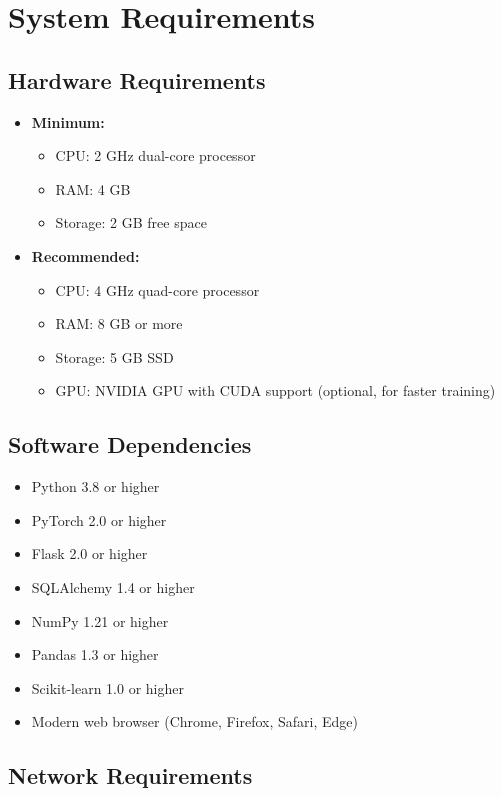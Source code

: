 \documentclass[12pt,a4paper,twoside]{report}
\begin{document}
\section{System Requirements}

\subsection{Hardware Requirements}

\begin{itemize}
    \item \textbf{Minimum:}
    \begin{itemize}
        \item CPU: 2 GHz dual-core processor
        \item RAM: 4 GB
        \item Storage: 2 GB free space
    \end{itemize}
    \item \textbf{Recommended:}
    \begin{itemize}
        \item CPU: 4 GHz quad-core processor
        \item RAM: 8 GB or more
        \item Storage: 5 GB SSD
        \item GPU: NVIDIA GPU with CUDA support (optional, for faster training)
    \end{itemize}
\end{itemize}

\subsection{Software Dependencies}

\begin{itemize}
    \item Python 3.8 or higher
    \item PyTorch 2.0 or higher
    \item Flask 2.0 or higher
    \item SQLAlchemy 1.4 or higher
    \item NumPy 1.21 or higher
    \item Pandas 1.3 or higher
    \item Scikit-learn 1.0 or higher
    \item Modern web browser (Chrome, Firefox, Safari, Edge)
\end{itemize}

\subsection{Network Requirements}
\end{document}
